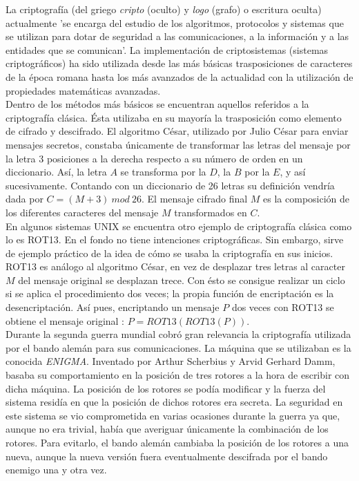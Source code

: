 \documentclass[../PFC.tex]{subfiles}
\begin{document}
La criptografía (del griego \textit{cripto} (oculto) y \textit{logo} (grafo) o escritura oculta) actualmente 'se encarga del estudio de los algoritmos, protocolos y sistemas que se utilizan para dotar de seguridad a las comunicaciones, a la información y a las entidades que se comunican'\cite{pastor1998criptografia}. La implementación de criptosistemas (sistemas criptográficos) ha sido utilizada desde las más básicas trasposiciones de caracteres de la época romana hasta los más avanzados de la actualidad con la utilización de propiedades matemáticas avanzadas.
\*
\vspace{0.5515cm}
\\
Dentro de los métodos más básicos se encuentran aquellos referidos a la criptografía clásica. Ésta utilizaba en su mayoría la trasposición como elemento de cifrado y descifrado. El algoritmo César, utilizado por Julio César para enviar mensajes secretos\cite{lucena}, constaba únicamente de transformar las letras del mensaje por la letra 3 posiciones a la derecha respecto a su número de orden en un diccionario. Así, la letra $A$ se transforma por la $D$, la $B$ por la $E$, y así sucesivamente. Contando con un diccionario de 26 letras su definición vendría dada por $C= (M + 3)\  mod\ 26$. El mensaje cifrado final $M$ es la composición de los diferentes caracteres del mensaje $M$ transformados en $C$.
\*
\vspace{0.5515cm}
\\
En algunos sistemas UNIX se encuentra otro ejemplo de criptografía clásica como lo es ROT13. En el fondo no tiene intenciones criptográficas. Sin embargo, sirve de ejemplo práctico de la idea de cómo se usaba la criptografía en sus inicios. ROT13 es análogo al algoritmo César, en vez de desplazar tres letras al caracter $M$ del mensaje original se desplazan trece. Con ésto se consigue realizar un ciclo si se aplica el procedimiento dos veces; la propia función de encriptación es la desencriptación. Así pues, encriptando un mensaje $P$ dos veces con ROT13 se obtiene el mensaje original : $P = ROT13 (ROT13 (P))$.
\*
\vspace{0.5515cm}
\\
Durante la segunda guerra mundial cobró gran relevancia la criptografía utilizada por el bando alemán para sus comunicaciones. La máquina que se utilizaban es la conocida \textit{ENIGMA}. Inventado por Arthur Scherbius y Arvid Gerhard Damm\cite{bruce}, basaba su comportamiento en la posición de tres rotores a la hora de escribir con dicha máquina. La posición de los rotores se podía modificar y la fuerza del sistema residía en que la posición de dichos rotores era secreta. La seguridad en este sistema se vio comprometida en varias ocasiones durante la guerra ya que, aunque no era trivial, había que averiguar únicamente la combinación de los rotores. Para evitarlo, el bando alemán cambiaba la posición de los rotores a una nueva, aunque la nueva versión fuera eventualmente descifrada por el bando enemigo una y otra vez.
\end{document}
